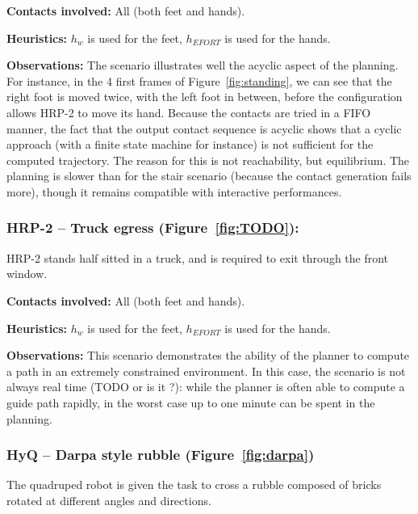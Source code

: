 \noindent\textbf{Contacts involved:} All (both feet and hands).

\noindent\textbf{Heuristics:} $h_w$ is used for the feet, $h_{EFORT}$ is used for the hands.

\noindent\textbf{Observations:} The scenario illustrates well the acyclic aspect of the planning. For instance, in the 4 first frames of Figure~\ref{fig:standing}, we can see that the right foot
is moved twice, with the left foot in between, before the configuration allows HRP-2 to move its hand.
Because the contacts are tried in a FIFO manner, the fact that the output contact sequence is acyclic shows that a cyclic approach (with a finite state machine for instance) is not sufficient
for the computed trajectory. The reason for this is not reachability, but equilibrium. The planning is slower than for the stair scenario (because the contact generation fails more),
though it remains compatible with interactive performances.

\subsubsection{HRP-2 -- Truck egress (Figure~\ref{fig:TODO}):}
HRP-2 stands half sitted in a truck, and is required to exit through the front window.



\noindent\textbf{Contacts involved:} All (both feet and hands).

\noindent\textbf{Heuristics:} $h_w$ is used for the feet, $h_{EFORT}$ is used for the hands.

\noindent\textbf{Observations:} This scenario demonstrates the ability of the planner to compute a path in an extremely constrained environment. In this case,
the scenario is not always real time (TODO or is it ?): while the planner is often able to compute a guide path rapidly, in the worst case up to one minute can be spent
in the planning.


\subsubsection{HyQ -- Darpa style rubble (Figure~\ref{fig:darpa})}
The quadruped robot is given the task to cross a rubble composed of bricks rotated at different angles and directions.


